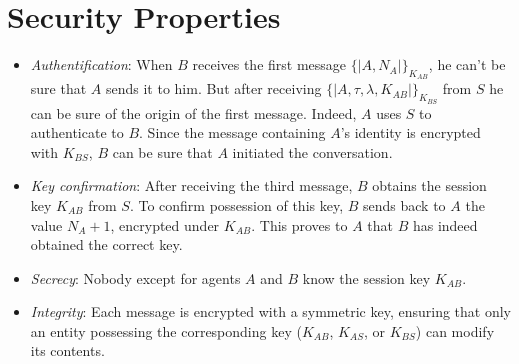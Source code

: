 \section {Security Properties}

\begin{itemize}
    \item \textit{Authentification}: When $B$ receives the first message $ \{|A,N_A|\}_{K_{AB}}$,
            he can't be sure that $A$ sends it to him. But after receiving $\{|A, \tau, \lambda, K_{AB}|\}_{K_{BS}}$
            from $S$ he can be sure of the origin of the first message. Indeed, $A$ uses $S$ to authenticate to $B$. Since the
            message containing $A$’s identity is encrypted with $K_{BS}$, $B$ can be sure that $A$ initiated the conversation.
    \item \textit{Key confirmation}: After receiving the third message, $B$ obtains the session key $K_{AB}$ from $S$.
                To confirm possession of this key, $B$ sends back to $A$ the value $N_A + 1$, encrypted under $K_{AB}$.
                This proves to $A$ that $B$ has indeed obtained the correct key.

    \item \textit{Secrecy}: Nobody except for agents $A$ and $B$ know the session key $K_{AB}$.
    \item \textit{Integrity}: Each message is encrypted with a symmetric key, ensuring that only an entity possessing
            the corresponding key ($K_{AB}$, $K_{AS}$, or $K_{BS}$) can modify its contents.


\end{itemize}
